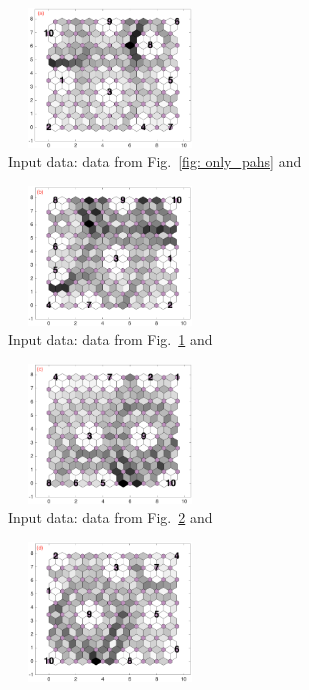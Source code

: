 \begin{figure}
    \begin{subfigure}[b]{0.25\textwidth}
        \centering
        \includegraphics[width=54mm, height=37mm]{../../images0.01/M31/2D/diff_dimension/combine_2D_data_between_cols3and11.png}
        \caption{Input data: data from Fig.~\ref{fig: only_pahs} and \halpha}
        \label{fig: col3and11_dist}
    \end{subfigure}
    \hfill
    \begin{subfigure}[b]{0.25\textwidth}
        \centering
        \includegraphics[width=54mm, height=37mm]{../../images0.01/M31/2D/diff_dimension/combine_2D_data_between_cols3and12.png}
        \caption{Input data: data from Fig.~\ref{fig: col3and11_dist} and \oiii}
        \label{fig: col3and12_dist}
    \end{subfigure}
        \hfill
    \begin{subfigure}[b]{0.25\textwidth}
        \centering
        \includegraphics[width=54mm, height=37mm]{../../images0.01/M31/2D/diff_dimension/combine_2D_data_between_cols3and13.png}
        \caption{Input data: data from Fig.~\ref{fig: col3and12_dist} and \sii}
        \label{fig: col3and13_dist}
    \end{subfigure}
        \hfill
    \begin{subfigure}[b]{0.25\textwidth}
        \centering
        \includegraphics[width=54mm, height=37mm]{../../images0.01/M31/2D/diff_dimension/combine_2D_data_between_cols3and14.png}

\end{subfigure}
\end{figure}
